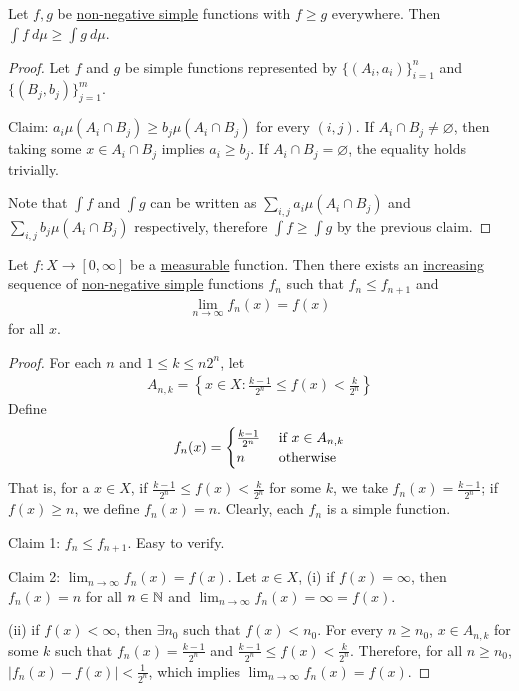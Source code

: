 \documentclass[11pt]{article}
\begin{document}
	\begin{proposition}
		Let $f, g$ be \ul{non-negative simple} functions with $f \geq g$ everywhere. Then $\int f\ d\mu \geq \int g\ d\mu$.
		\begin{proof}
			Let $f$ and $g$ be simple functions represented by $\{(A_i, a_i)\}_{i=1}^n$ and $\{(B_j, b_j)\}_{j=1}^m$.
			
			Claim: $a_i \mu(A_i \cap B_j) \geq b_j \mu(A_i \cap B_j)$ for every $(i, j)$. If $A_i \cap B_j \neq \varnothing$, then taking some $x \in A_i \cap B_j$ implies $a_i \geq b_j$. If $A_i \cap B_j = \varnothing$, the equality holds trivially.
			
			Note that $\int f$ and $\int g$ can be written as $\sum_{i, j} a_i \mu(A_i \cap B_j)$ and $\sum_{i, j} b_j \mu(A_i \cap B_j)$ respectively, therefore $\int f \geq \int g$ by the previous claim.
		\end{proof}
	\end{proposition}
	
	\begin{proposition}
		Let $f: X \to [0, \infty]$ be a \ul{measurable} function. Then there exists an \ul{increasing} sequence of \ul{non-negative simple} functions $f_n$ such that $f_n \leq f_{n+1}$ and 
		\begin{align}
			\lim_{n \to \infty} f_n(x) = f(x)	
		\end{align}
		for all $x$.
		\begin{proof}
			For each $n$ and $1 \leq k \leq n 2^n$, let
			\begin{align}
				A_{n, k}=\left\{x \in X: \frac{k-1}{2^{n}} \leq f(x)<\frac{k}{2^{n}}\right\}
			\end{align}
			Define
			\begin{align}
				f_n(x) = \begin{cases}
					\frac{k-1}{2^n} &\text{{ if }} x \in A_{n, k} \\
					n &\text{{ otherwise}}
				\end{cases}
			\end{align}
			That is, for a $x \in X$, if $\frac{k-1}{2^{n}} \leq f(x)<\frac{k}{2^{n}}$ for some $k$, we take $f_n(x) = \frac{k-1}{2^{n}}$; if $f(x) \geq n$, we define $f_n(x) = n$. Clearly, each $f_n$ is a simple function.
			
			Claim 1: $f_n \leq f_{n+1}$. Easy to verify.
			
			Claim 2: $\lim_{n \to \infty} f_n(x) = f(x)$. Let $x \in X$, (i) if $f(x) = \infty$, then $f_n(x) = n$ for all $n \in \mathbb{N}$ and $\lim_{n \to \infty} f_n(x) = \infty = f(x)$.
			
			(ii) if $f(x) < \infty$, then $\exists n_0$ such that $f(x) < n_0$. For every $n \geq n_0$, $x \in A_{n,k}$ for some $k$ such that $f_n(x) = \frac{k-1}{2^n}$ and $\frac{k-1}{2^n} \leq f(x) < \frac{k}{2^n}$. Therefore, for all $n \geq n_0$, $|f_n(x) - f(x)| < \frac{1}{2^n}$, which implies $\lim_{n \to \infty} f_n(x) = f(x)$.
		\end{proof}
	\end{proposition}
	
\end{document}
